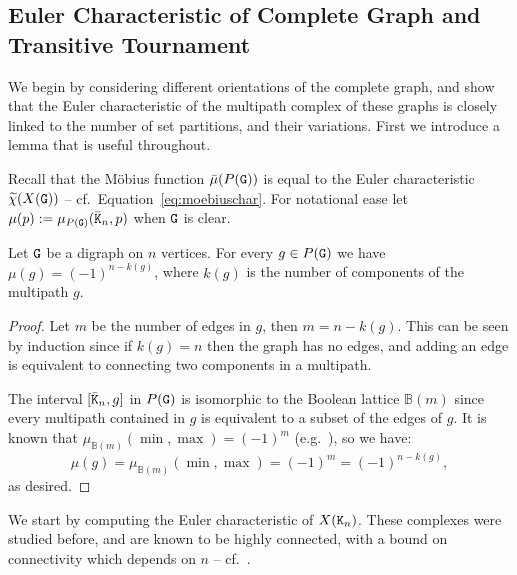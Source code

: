 \documentclass{amsart}
\begin{document}
 \subsection{Euler Characteristic of Complete Graph and Transitive Tournament}
 We begin by considering different orientations of the complete graph, and show that the Euler characteristic of the multipath complex of these graphs is closely linked to the number of set partitions, and their variations. First we introduce a lemma that is useful throughout.
 
Recall that the M\"obius function $\bar{\mu}(P({\tt G}))$ is equal to the Euler characteristic $\widetilde{\chi}(X({\tt G}))$ -- cf.~Equation~\ref{eq:moebiuschar}. For notational ease let $\mu(p):=\mu_{P({\tt G})}(\bar{{\tt K}}_n,p)$ when ${\tt G}$ is clear. 
 
 \begin{lem}\label{lem:sign}
   Let ${\tt G}$ be a digraph on $n$ vertices. For every $g\in P({\tt G})$ we have $\mu(g)=(-1)^{n-k(g)}$, where $k(g)$ is the number of components of the multipath $g$.
    \end{lem}
   \begin{proof}
Let $m$ be the number of edges in $g$, then $m=n-k(g)$. This can be seen by induction since if $k(g)=n$ then the graph has no edges, and adding an edge is equivalent to connecting two components in a multipath.
    
The interval $[\bar{{\tt K}}_n,g]$ in $P({\tt G})$ is isomorphic to the Boolean lattice $\mathbb{B}(m)$ since every multipath contained in $g$ is equivalent to a subset of the edges of $g$. It is known that $\mu_{\mathbb{B}(m)}(\min,\max)=(-1)^{m}$ (e.g.~\cite[Example~1.1.1]{Wac07}), so we have:
\[\mu(g)  = \mu_{\mathbb{B}(m)}(\min,\max)=(-1)^{m}=(-1)^{n-k(g)},\]
as desired.
\end{proof}


We start by computing the Euler characteristic of $X({\tt K}_n)$. These complexes were studied before, and are known to be highly connected, with a bound on connectivity which depends on $n$ -- cf.~\cite[Theorem~10]{Omega}.
\end{document}
